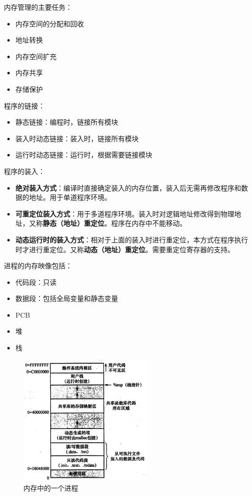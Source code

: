 \documentclass[12pt, a4paper, oneside]{ctexart}
\begin{document}
内存管理的主要任务：
\begin{itemize}
  \item 内存空间的分配和回收
  \item 地址转换
  \item 内存空间扩充
  \item 内存共享
  \item 存储保护
\end{itemize}

程序的链接：
\begin{itemize}
  \item 静态链接：编程时，链接所有模块
  \item 装入时动态链接：装入时，链接所有模块
  \item 运行时动态链接：运行时，根据需要链接模块
\end{itemize}

程序的装入：
\begin{itemize}
  \item \textbf{绝对装入方式}：编译时直接确定装入的内存位置，装入后无需再修改程序和数据的地址。用于单道程序环境。
  \item \textbf{可重定位装入方式}：用于多道程序环境。装入时对逻辑地址修改得到物理地址，又称\textbf{静态（地址）重定位}。程序在内存中不能移动。
  \item \textbf{动态运行时的装入方式}：相对于上面的装入时进行重定位，本方式在程序执行时才进行重定位。又称\textbf{动态（地址）重定位}。需要重定位寄存器的支持。
\end{itemize}

进程的内存映像包括：
\begin{itemize}
  \item 代码段：只读
  \item 数据段：包括全局变量和静态变量
  \item PCB
  \item 堆
  \item 栈
\end{itemize}

\begin{figure}
  \centering
  \includegraphics[width=0.6\textwidth]{./images/process_in_memory.png}
  \caption{内存中的一个进程}
\end{figure}
\end{document}
